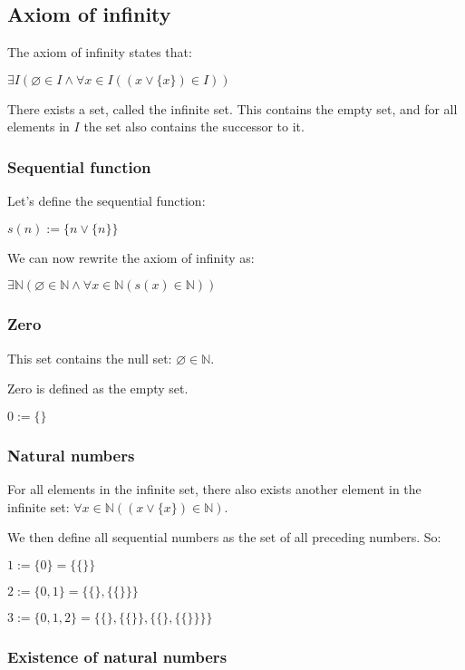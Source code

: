 
\subsection{Axiom of infinity}


The axiom of infinity states that:

\(\exists I (\varnothing \in I \land \forall x \in I((x\lor \{x\})\in I))\)

There exists a set, called the infinite set. This contains the empty set, and for all elements in \(I\) the set also contains the successor to it.

\subsubsection{Sequential function}

Let's define the sequential function:

\(s(n):=\{n\lor \{n\}\}\)

We can now rewrite the axiom of infinity as:

\(\exists \mathbb{N} (\varnothing \in \mathbb{N} \land \forall x \in \mathbb{N}(s(x)\in \mathbb{N}))\)

\subsubsection{Zero}

This set contains the null set: \(\varnothing \in \mathbb{N} \).

Zero is defined as the empty set.

\(0:=\{\}\)

\subsubsection{Natural numbers}

For all elements in the infinite set, there also exists another element in the infinite set: \(\forall x \in \mathbb{N}((x\lor \{x\})\in \mathbb{N}) \).

We then define all sequential numbers as the set of all preceding numbers. So:

\(1:=\{0\}=\{\{\}\}\)

\(2:=\{0,1\}=\{\{\},\{\{\}\}\}\)

\(3:=\{0,1,2\}=\{\{\},\{\{\}\},\{\{\},\{\{\}\}\}\}\)

\subsubsection{Existence of natural numbers}

